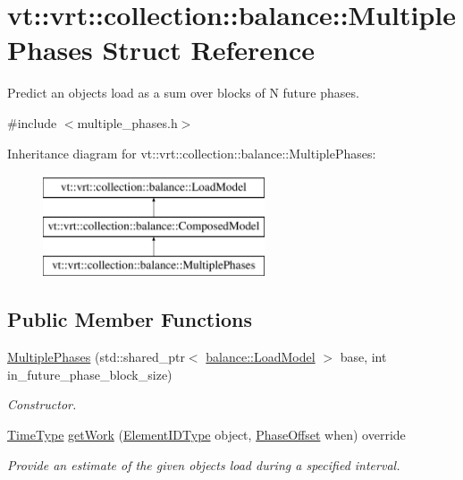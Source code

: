 \hypertarget{structvt_1_1vrt_1_1collection_1_1balance_1_1_multiple_phases}{}\section{vt\+:\+:vrt\+:\+:collection\+:\+:balance\+:\+:Multiple\+Phases Struct Reference}
\label{structvt_1_1vrt_1_1collection_1_1balance_1_1_multiple_phases}


Predict an object\textquotesingle{}s load as a sum over blocks of N future phases.  




{\ttfamily \#include $<$multiple\+\_\+phases.\+h$>$}

Inheritance diagram for vt\+:\+:vrt\+:\+:collection\+:\+:balance\+:\+:Multiple\+Phases\+:\begin{figure}[H]
\begin{center}
\leavevmode
\includegraphics[height=3.000000cm]{structvt_1_1vrt_1_1collection_1_1balance_1_1_multiple_phases}
\end{center}
\end{figure}
\subsection*{Public Member Functions}
\begin{DoxyCompactItemize}
\item 
\hyperlink{structvt_1_1vrt_1_1collection_1_1balance_1_1_multiple_phases_a28aba5fe005d35319e34ca8406aca936}{Multiple\+Phases} (std\+::shared\+\_\+ptr$<$ \hyperlink{classvt_1_1vrt_1_1collection_1_1balance_1_1_load_model}{balance\+::\+Load\+Model} $>$ base, int in\+\_\+future\+\_\+phase\+\_\+block\+\_\+size)
\begin{DoxyCompactList}\small\item\em Constructor. \end{DoxyCompactList}\item 
\hyperlink{namespacevt_a876a9d0cd5a952859c72de8a46881442}{Time\+Type} \hyperlink{structvt_1_1vrt_1_1collection_1_1balance_1_1_multiple_phases_a5adc006905ed0521ba40827df6d15575}{get\+Work} (\hyperlink{namespacevt_1_1vrt_1_1collection_1_1balance_a14c8d2c972f2913aa3f1636e5be0a120}{Element\+I\+D\+Type} object, \hyperlink{structvt_1_1vrt_1_1collection_1_1balance_1_1_phase_offset}{Phase\+Offset} when) override
\begin{DoxyCompactList}\small\item\em Provide an estimate of the given object\textquotesingle{}s load during a specified interval. \end{DoxyCompactList}\end{DoxyCompactItemize}
